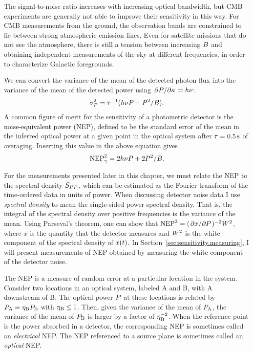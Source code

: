 The signal-to-noise ratio increases with increasing optical bandwidth, but CMB experiments are generally not able to improve their sensitivity in this way.
For CMB measurements from the ground, the observation bands are constrained to lie between strong atmospheric emission lines.
Even for satellite missions that do not see the atmosphere, there is still a tension between increasing $B$ and obtaining independent measurements of the sky at different frequencies, in order to characterize Galactic foregrounds.

We can convert the variance of the mean of the detected photon flux into the variance of the mean of the detected power using
$\pdv*{P}{\kappa} = h \nu$:
\begin{equation}
\sigma_P^2
  =
  \tau^{-1} (h \nu P + P^2 / B).
\end{equation}
A common figure of merit for the sensitivity of a photometric detector is the noise-equivalent power (NEP), defined to be the standard error of the mean in the inferred optical power at a given point in the optical system after
$\tau = \SI{0.5}{s}$ of averaging.
Inserting this value in the above equation gives
\begin{equation}
\mathrm{NEP}_\gamma^2
  =
  2 h \nu P + 2 P^2 / B.
\end{equation}

For the measurements presented later in this chapter, we must relate the NEP to the spectral density $S_{P P}$, which can be estimated as the Fourier transform of the time-ordered data in units of power.
When discussing detector noise data I use \textit{spectral density} to mean the single-sided power spectral density.
That is, the integral of the spectral density over positive frequencies is the variance of the mean.
Using Parseval's theorem, one can show that
$\mathrm{NEP}^2 = (\pdv*{x}{P})^{-2} W^2 $,
where $x$ is the quantity that the detector measures and $W^2$ is the white component of the spectral density of $x(t)$.
In Section~\ref{sec:sensitivity.measuring}, I will present measurements of NEP obtained by measuring the white component of the detector noise.

The NEP is a measure of random error at a particular location in the system.
Consider two locations in an optical system, labeled A and B, with A downstream of B.
The optical power $P$ at these locations is related by
$P_\mathrm{A} = \eta_\mathrm{B} P_\mathrm{B}$
with $\eta_\mathrm{B} \le 1$.
Then, given the variance of the mean of $P_\mathrm{A}$, the variance of the mean of $P_\mathrm{B}$ is larger by a factor of $\eta_\mathrm{B}^{-2}$.
When the reference point is the power absorbed in a detector, the corresponding NEP is sometimes called an \textit{electrical} NEP.
The NEP referenced to a source plane is sometimes called an \textit{optical} NEP.

